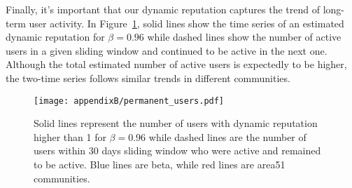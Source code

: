 Finally, it's important that our dynamic reputation captures the trend of long-term user activity. In Figure~\ref{fig:active-users}, solid lines show the time series of an estimated dynamic reputation for $\beta = 0.96$ while dashed lines show the number of active users in a given sliding window and continued to be active in the next one. Although the total estimated number of active users is expectedly to be higher, the two-time series follows similar trends in different communities.

\begin{figure}[H]
	\centering
	\texttt{[image: appendixB/permanent\_users.pdf]}
	\caption[Number of users in Stack Exchange community who remain to be active]{Solid lines represent the number of users with dynamic reputation higher than 1 for $\beta=0.96$ while dashed lines are the number of users within 30 days sliding window who were active and remained to be active. Blue lines are beta, while red lines are area51 communities.}
	\label{fig:active-users}
\end{figure}

\clearpage
